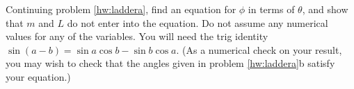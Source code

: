 Continuing problem \ref{hw:laddera}, find an equation for $\phi$
in terms of $\theta$, and show that $m$ and $L$ do not enter into the
equation. Do not assume any numerical values for any of the
variables. You will need the trig identity $\sin(a-b) = \sin a
\cos b - \sin b \cos a$. (As a numerical check on your result,
you may wish to check that the angles given in problem \ref{hw:laddera}b
satisfy your equation.)\answercheck
